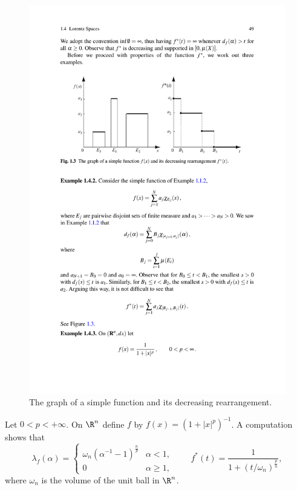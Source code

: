 \begin{figure}[htbp]
\centering
\includegraphics{pictures/rearrangement-of-simple}
\caption{The graph of a simple function and its decreasing rearrangement.}
\end{figure}
\begin{example}
Let $0<p<+\infty$. On $\R^n$ define $f$ by $f(x)=(1+|x|^p)^{-1}$. A computation shows that
\[\lambda_f(\alpha)=\begin{cases}
\omega_n(\alpha^{-1}-1)^{\frac{n}{p}}&\alpha<1,\\
0&\alpha\geq 1,
\end{cases}\quad\quad f^*(t)=\frac{1}{1+(t/\omega_n)^{\frac{p}{n}}},\]
where $\omega_n$ is the volume of the unit ball in $\R^n$.
\end{example}
